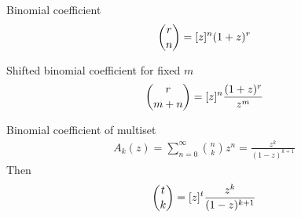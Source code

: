 ﻿\begin{identity}
    Binomial coefficient
    \begin{align*}
        \binom{r}{n} = [z]^{n} (1+z)^r
    \end{align*}
\end{identity}
\begin{identity}
    Shifted binomial coefficient for fixed $m$
    \begin{align*}
        \binom{r}{m+n} = [z]^{n} \frac{(1+z)^r}{z^m}
    \end{align*}
\end{identity}
\begin{identity}
    Binomial coefficient of multiset
    \begin{align*}
        A_k(z) = \sum_{n=0}^{\infty} \binom{n}{k} z^n = \frac{z^k}{(1-z)^{k+1}}
    \end{align*}
    Then
    \begin{align*}
        \binom{t}{k} = [z]^{t} \frac{z^k}{(1-z)^{k+1}}
    \end{align*}
\end{identity}
